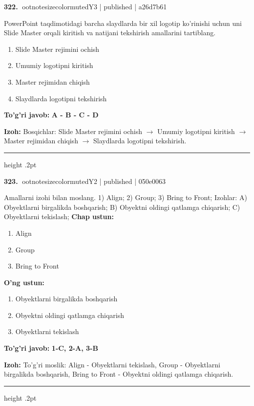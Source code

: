 \documentclass[10pt,a4paper]{article}
\begin{document}
\textbf{\color{ink}322.} {ootnotesizecolor{muted}Y3 | published | a26d7b61}
\par
PowerPoint taqdimotidagi barcha slaydlarda bir xil logotip ko'rinishi uchun uni Slide Master orqali kiritish va natijani tekshirish amallarini tartiblang.
\begin{enumerate}[label=\Alph*),leftmargin=9mm]
\item Slide Master rejimini ochish
\item Umumiy logotipni kiritish
\item Master rejimidan chiqish
\item Slaydlarda logotipni tekshirish
\end{enumerate}
\begin{tcolorbox}[enhanced,breakable,colback=teal!4,colframe=teal!55!black,boxrule=0.45pt,arc=1.2mm,left=2.8mm,right=2.8mm,top=2mm,bottom=2mm]
\textbf{\color{teal}To'g'ri javob:} \textbf{A - B - C - D}
\par\smallskip
\textbf{Izoh:} Bosqichlar: Slide Master rejimini ochish \ensuremath{\rightarrow} Umumiy logotipni kiritish \ensuremath{\rightarrow} Master rejimidan chiqish \ensuremath{\rightarrow} Slaydlarda logotipni tekshirish.
\end{tcolorbox}
\vspace{2mm}\hrule height .2pt\vspace{2mm}

\textbf{\color{ink}323.} {ootnotesizecolor{muted}Y2 | published | 050e0063}
\par
Amallarni izohi bilan moslang.  1) Align;  2) Group;  3) Bring to Front;  Izohlar: A) Obyektlarni birgalikda boshqarish;  B) Obyektni oldingi qatlamga chiqarish;  C) Obyektlarni tekislash;
\textbf{Chap ustun:}\begin{enumerate}[label=\arabic*),leftmargin=9mm]
\item Align
\item Group
\item Bring to Front
\end{enumerate}
\textbf{O'ng ustun:}\begin{enumerate}[label=\Alph*),leftmargin=9mm]
\item Obyektlarni birgalikda boshqarish
\item Obyektni oldingi qatlamga chiqarish
\item Obyektlarni tekislash
\end{enumerate}
\begin{tcolorbox}[enhanced,breakable,colback=teal!4,colframe=teal!55!black,boxrule=0.45pt,arc=1.2mm,left=2.8mm,right=2.8mm,top=2mm,bottom=2mm]
\textbf{\color{teal}To'g'ri javob:} \textbf{1-C, 2-A, 3-B}
\par\smallskip
\textbf{Izoh:} To'g'ri moslik: Align - Obyektlarni tekislash, Group - Obyektlarni birgalikda boshqarish, Bring to Front - Obyektni oldingi qatlamga chiqarish.
\end{tcolorbox}
\vspace{2mm}\hrule height .2pt\vspace{2mm}
\end{document}
